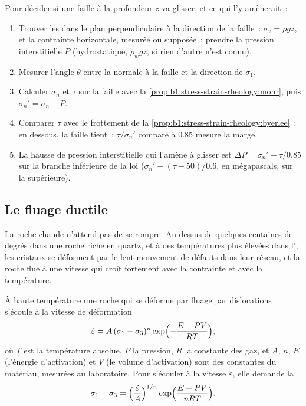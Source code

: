 \begin{method}\label{met:b1:stress-strain-rheology:slip-test}
Pour décider si une faille à la profondeur $z$ va glisser, et ce qui l'y amènerait~:
\begin{enumerate}
  \item Trouver les  dans le plan perpendiculaire à la direction
        de la faille~: $\sigma_v = \rho g z$, et la contrainte horizontale, mesurée
        ou supposée~; prendre la pression interstitielle $P$ (hydrostatique, $\rho_w g z$, si
        rien d'autre n'est connu).
  \item Mesurer l'angle $\theta$ entre la normale à la faille et la
        direction de $\sigma_1$.
  \item Calculer $\sigma_n$ et $\tau$ sur la faille avec
        la \cref{prop:b1:stress-strain-rheology:mohr}, puis
        $\sigma_n' = \sigma_n - P$.
  \item Comparer $\tau$ avec le frottement de
        la \cref{prop:b1:stress-strain-rheology:byerlee}~: en dessous, la faille tient~;
        $\tau/\sigma_n'$ comparé à 0.85 mesure la marge.
  \item La hausse de pression interstitielle qui l'amène à glisser est
        $\Delta P = \sigma_n' - \tau/0.85$ sur la branche inférieure de la loi
        ($\sigma_n' - (\tau - 50)/0.6$, en mégapascals, sur la supérieure).
\end{enumerate}
\end{method}

\subsection*{Le fluage ductile}

La roche chaude n'attend pas de se rompre. Au-dessus de quelques centaines de degrés dans une roche
riche en quartz, et à des températures plus élevées dans l', les cristaux se déforment par le lent mouvement de défauts
dans leur réseau, et la roche flue à une vitesse qui croît fortement avec
la contrainte et avec la température.

\begin{proposition}\label{prop:b1:stress-strain-rheology:creep}
À haute température une roche qui se déforme par fluage par dislocations s'écoule à la vitesse de
déformation
\[
  \dot\varepsilon = A\,(\sigma_1 - \sigma_3)^n \exp\Bigl(-\frac{E + PV}{RT}\Bigr),
\]
où $T$ est la température absolue, $P$ la pression, $R$ la constante des
gaz, et $A$, $n$, $E$ (l'énergie d'activation) et $V$ (le volume d'activation) sont
des constantes du matériau, mesurées au laboratoire. Pour s'écouler à
la vitesse $\dot\varepsilon$, elle demande la 
\[
  \sigma_1 - \sigma_3 = \Bigl(\frac{\dot\varepsilon}{A}\Bigr)^{1/n}
  \exp\Bigl(\frac{E + PV}{nRT}\Bigr).
\]
\end{proposition}
\admitted

